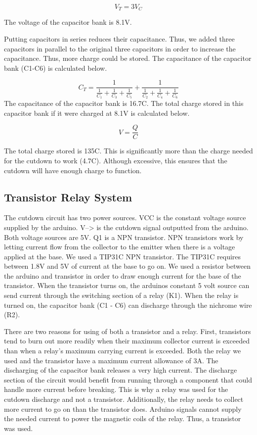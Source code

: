 \documentclass[12pt,]{article}
\begin{document}
\[V_{T} = 3V_{C}\]

The voltage of the capacitor bank is 8.1V.

Putting capacitors in series reduces their capacitance. Thus, we added
three capacitors in parallel to the original three capacitors in order
to increase the capacitance. Thus, more charge could be stored. The
capacitance of the capacitor bank (C1-C6) is calculated below.

\[C_{T} = \frac{1}{\frac{1}{C_{1}} + \frac{1}{C_{3}} + \frac{1}{C_{5}}}+\frac{1}{\frac{1}{C_{2}} + \frac{1}{C_{4}} + \frac{1}{C_{6}}}\]
The capacitance of the capacitor bank is 16.7C. The total charge stored
in this capacitor bank if it were charged at 8.1V is calculated below.

\[V=\frac{Q}{C}\]

The total charge stored is 135C. This is significantly more than the
charge needed for the cutdown to work (4.7C). Although excessive, this
ensures that the cutdown will have enough charge to function.

\subsection{Transistor Relay System}\label{transistor-relay-system}

The cutdown circuit has two power sources. VCC is the constant voltage
source supplied by the arduino. V--\textgreater{} is the cutdown signal
outputted from the arduino. Both voltage sources are 5V. Q1 is a NPN
transistor. NPN transistors work by letting current flow from the
collector to the emitter when there is a voltage applied at the base. We
used a TIP31C NPN transistor. The TIP31C requires between 1.8V and 5V of
current at the base to go on. We used a resistor between the arduino and
transistor in order to draw enough current for the base of the
transistor. When the transistor turns on, the arduinos constant 5 volt
source can send current through the switching section of a relay (K1).
When the relay is turned on, the capacitor bank (C1 - C6) can discharge
through the nichrome wire (R2).

There are two reasons for using of both a transistor and a relay. First,
transistors tend to burn out more readily when their maximum collector
current is exceeded than when a relay's maximum carrying current is
exceeded. Both the relay we used and the transistor have a maximum
current allowance of 3A. The discharging of the capacitor bank releases
a very high current. The discharge section of the circuit would benefit
from running through a component that could handle more current before
breaking. This is why a relay was used for the cutdown discharge and not
a transistor. Additionally, the relay needs to collect more current to
go on than the transistor does. Arduino signals cannot supply the needed
current to power the magnetic coils of the relay. Thus, a transistor was
used.
\end{document}
